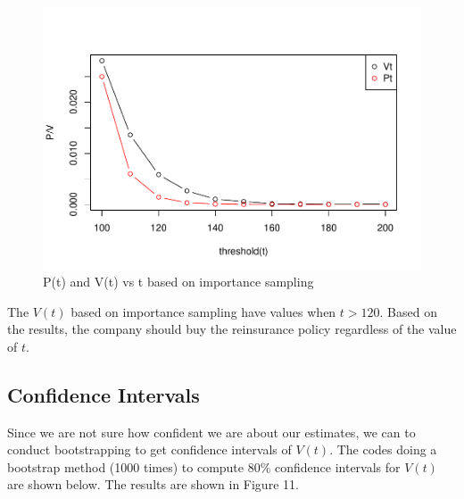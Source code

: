 \documentclass[11pt,]{article}
\newenvironment{Shaded}{\begin{snugshade}}{\end{snugshade}}
\newcommand{\CommentTok}[1]{\textcolor[rgb]{0.56,0.35,0.01}{\textit{#1}}}
\newcommand{\DecValTok}[1]{\textcolor[rgb]{0.00,0.00,0.81}{#1}}
\newcommand{\FloatTok}[1]{\textcolor[rgb]{0.00,0.00,0.81}{#1}}
\newcommand{\KeywordTok}[1]{\textcolor[rgb]{0.13,0.29,0.53}{\textbf{#1}}}
\newcommand{\NormalTok}[1]{#1}
\newcommand{\OperatorTok}[1]{\textcolor[rgb]{0.81,0.36,0.00}{\textbf{#1}}}
\newcommand{\StringTok}[1]{\textcolor[rgb]{0.31,0.60,0.02}{#1}}
\begin{document}
\begin{figure}
\centering
\includegraphics{figs/unnamed-chunk-27.pdf}
\caption{P(t) and V(t) vs t based on importance sampling}
\end{figure}

The \(V(t)\) based on importance sampling have values when \(t>120\).
Based on the results, the company should buy the reinsurance policy
regardless of the value of \(t\).

\hypertarget{confidence-intervals}{%
\subsection{Confidence Intervals}\label{confidence-intervals}}

Since we are not sure how confident we are about our estimates, we can
to conduct bootstrapping to get confidence intervals of \(V(t)\). The
codes doing a bootstrap method (1000 times) to compute 80\% confidence
intervals for \(V(t)\) are shown below. The results are shown in Figure
11.

\begin{Shaded}
\end{Shaded}
\end{document}
